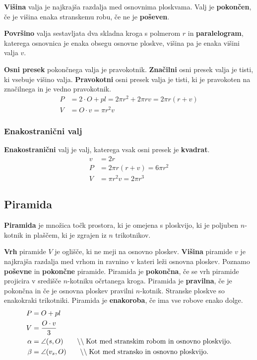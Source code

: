 \documentclass[a4paper,oneside,12pt,fleqn]{article}
\newcommand\krat\cdot
\newcommand{\comment}[1]{\ensuremath{\qquad\backslash\backslash\;}\textnormal{#1}}
\numberwithin{equation}{section}
\begin{document}
\textbf{Višina} valja je najkrajša razdalja med osnovnima ploskvama. Valj je
\textbf{pokončen}, če je višina
enaka stranskemu robu, če ne je \textbf{poševen}.

\textbf{Površino} valja sestavljata dva skladna kroga s polmerom $r$ in
\textbf{paralelogram}, katerega
osnovnica je enaka obsegu osnovne ploskve, višina pa je enaka višini valja $v$.

\textbf{Osni presek} pokončnega valja je pravokotnik. \textbf{Značilni} osni presek valja je tisti, ki
vsebuje višino valja. \textbf{Pravokotni} osni presek valja je tisti, ki je pravokoten na
značilnega in je vedno pravokotnik.
\begin{align*}
  P &= 2 \krat O + pl = 2\pi r^2 + 2\pi rv = 2\pi r(r+v) \\
  V &= O \krat v = \pi r^2v
\end{align*}

\subsubsection{Enakostranični valj}
\label{sec:tel:valj:enak}
\textbf{Enakostranični} valj je valj, katerega vsak osni presek je \textbf{kvadrat}.
\begin{align*}
  v &= 2r \\
  P &= 2\pi r(r+v) = 6\pi r^2 \\
  V &= \pi r^2v = 2\pi r^3
\end{align*}

\subsection{Piramida}
\label{sec:tel:pir}
\textbf{Piramida} je množica točk prostora, ki je omejena s ploskvijo, ki je poljuben $n$-kotnik in plaščem, ki
je zgrajen iz $n$ trikotnikov.

\textbf{Vrh} piramide $V$ je oglišče, ki ne meji na osnovno ploskev. \textbf{Višina}
piramide $v$ je najkrajša razdalja med
vrhom in ravnino v kateri leži osnovna ploskev. Poznamo \textbf{poševne} in
\textbf{pokončne} piramide. Piramida je \textbf{pokončna},
če se vrh piramide projicira v središče $n$-kotniku očrtanega kroga. Piramida je
\textbf{pravilna}, če je pokončna in če je osnovna ploskev pravilni $n$-kotnik.
Stranske ploskve so enakokraki trikotniki. Piramida je \textbf{enakoroba}, če ima
vse robove enako dolge.
\begin{align*}
  P &= O + pl \\
  V &= \frac{O \krat v}{3} \\
  \alpha &= \angle(s,O) \comment{Kot med stranskim robom in osnovno ploskvijo.} \\
  \beta &= \angle(v_s,O) \comment{Kot med stransko in osnovno ploskvijo.}
\end{align*}
\end{document}

